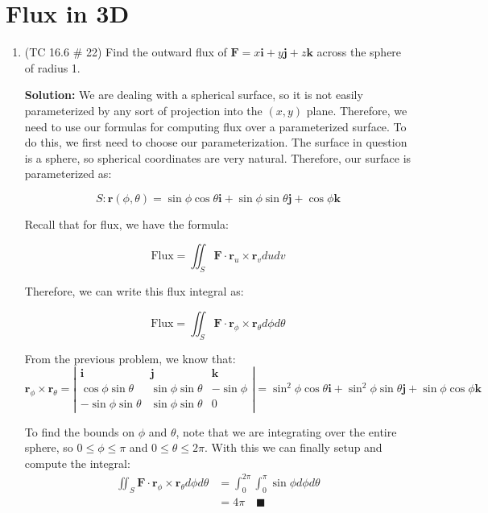 \documentclass[letterpaper, 11pt]{article}
\begin{document}
\section{Flux in 3D}
\begin{enumerate}
\item (TC 16.6 \# 22) Find the outward flux of $\bm{F} = x \bm{i} + y \bm{j} + z \bm{k}$ across the sphere of radius 1. 

\par \textbf{Solution:} We are dealing with a spherical surface, so it is not easily parameterized by any sort of projection into the $(x,y)$ plane. Therefore, we need to use our formulas for computing flux over a parameterized surface. To do this, we first need to choose our parameterization. The surface in question is a sphere, so spherical coordinates are very natural. Therefore, our surface is parameterized as:

\[ S : \bm{r}(\phi,\theta) = \sin \phi\cos \theta \bm{i} + \sin \phi \sin \theta \bm{j} + \cos \phi \bm{k} \]

Recall that for flux, we have the formula:

\[ \text{Flux} = \iint_S \bm{F} \cdot \bm{r}_u \times \bm{r}_v du dv \]

Therefore, we can write this flux integral as:

\[ \text{Flux} = \iint_S \bm{F} \cdot \bm{r}_\phi \times \bm{r}_\theta d\phi d \theta \]

From the previous problem, we know that:
\[ \bm{r}_\phi \times \bm{r}_\theta =\left| \begin{array}{ccc} \bm{i} & \bm{j} & \bm{k}\\  \cos \phi \sin \theta &  \sin \phi \sin \theta & -  \sin \phi	 \\ - \sin \phi \sin \theta &  \sin \phi \sin \theta & 0 \end{array} \right| = \sin^2 \phi \cos \theta \bm{i} + \sin^2 \phi \sin \theta \bm{j} + \sin \phi \cos \phi \bm{k}  \]

To find the bounds on $\phi$ and $\theta$, note that we are integrating over the entire sphere, so $0 \leq \phi \leq \pi$ and $0 \leq \theta \leq 2 \pi$. With this we can finally setup and compute the integral:
\begin{align*}
\iint_S \bm{F} \cdot \bm{r}_\phi \times \bm{r}_\theta d\phi d\theta &= \int_0^{2\pi} \int_0^\pi \sin \phi d\phi d\theta \\
&= 4 \pi \quad\blacksquare
\end{align*}


\end{enumerate}
\end{document}
